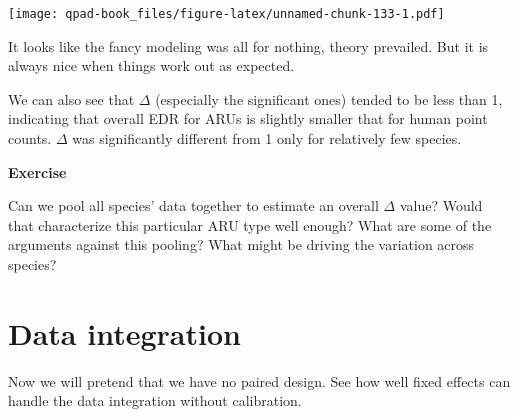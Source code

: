 \documentclass[12pt,]{book}
\let\BeginKnitrBlock\begin \let\EndKnitrBlock\end
\begin{document}
\texttt{[image: qpad-book\_files/figure-latex/unnamed-chunk-133-1.pdf]}

It looks like the fancy modeling was all for nothing,
theory prevailed. But it is always nice when things work out
as expected.

We can also see that \(\Delta\) (especially the significant ones)
tended to be less than 1, indicating that overall EDR for ARUs
is slightly smaller that for human point counts. \(\Delta\)
was significantly different from 1 only for relatively few species.

\BeginKnitrBlock{rmdexercise}
\textbf{Exercise}

Can we pool all species' data together to estimate an overall \(\Delta\)
value? Would that characterize this particular ARU type well enough?
What are some of the arguments against this pooling? What might be
driving the variation across species?
\EndKnitrBlock{rmdexercise}

\hypertarget{data-integration}{%
\section{Data integration}\label{data-integration}}

Now we will pretend that we have no paired design. See how well
fixed effects can handle the data integration without calibration.
\end{document}
